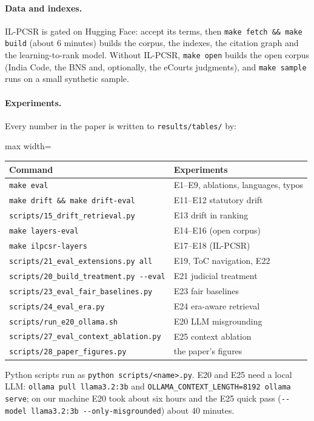 \documentclass[sigconf,nonacm]{acmart}
\begin{document}
\paragraph{Data and indexes.} IL-PCSR is gated on Hugging Face: accept its terms, then
\texttt{make fetch \&\& make build} (about 6 minutes) builds the corpus, the indexes, the citation
graph and the learning-to-rank model. Without IL-PCSR, \texttt{make open} builds the open corpus
(India Code, the BNS and, optionally, the eCourts judgments), and \texttt{make sample} runs on a
small synthetic sample.

\paragraph{Experiments.} Every number in the paper is written to \texttt{results/tables/} by:
\begin{center}\small
\begin{adjustbox}{max width=\columnwidth}
\begin{tabular}{@{}ll@{}}
\toprule
Command & Experiments \\
\midrule
\texttt{make eval} & E1--E9, ablations, languages, typos \\
\texttt{make drift \&\& make drift-eval} & E11--E12 statutory drift \\
\texttt{scripts/15\_drift\_retrieval.py} & E13 drift in ranking \\
\texttt{make layers-eval} & E14--E16 (open corpus) \\
\texttt{make ilpcsr-layers} & E17--E18 (IL-PCSR) \\
\texttt{scripts/21\_eval\_extensions.py all} & E19, ToC navigation, E22 \\
\texttt{scripts/20\_build\_treatment.py -{}-eval} & E21 judicial treatment \\
\texttt{scripts/23\_eval\_fair\_baselines.py} & E23 fair baselines \\
\texttt{scripts/24\_eval\_era.py} & E24 era-aware retrieval \\
\texttt{scripts/run\_e20\_ollama.sh} & E20 LLM misgrounding \\
\texttt{scripts/27\_eval\_context\_ablation.py} & E25 context ablation \\
\texttt{scripts/28\_paper\_figures.py} & the paper's figures \\
\bottomrule
\end{tabular}
\end{adjustbox}
\end{center}
Python scripts run as \texttt{python scripts/<name>.py}. E20 and E25 need a local LLM:
\texttt{ollama pull llama3.2:3b} and \texttt{OLLAMA\_CONTEXT\_LENGTH=8192 ollama serve}; on our
machine E20 took about six hours and the E25 quick pass
(\texttt{-{}-model llama3.2:3b -{}-only-misgrounded}) about 40 minutes.
\end{document}
